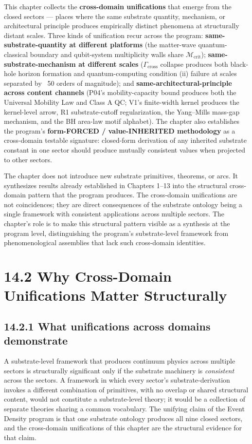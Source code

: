 \documentclass[11pt]{book}
\begin{document}
This chapter collects the \textbf{cross-domain unifications} that emerge from the closed sectors — places where the same substrate quantity, mechanism, or architectural principle produces empirically distinct phenomena at structurally distant scales. Three kinds of unification recur across the program: \textbf{same-substrate-quantity at different platforms} (the matter-wave quantum-classical boundary and qubit-system multiplicity walls share $\mathcal{M}_\mathrm{crit}$); \textbf{same-substrate-mechanism at different scales} ($\Gamma_\mathrm{cross}$ collapse produces both black-hole horizon formation and quantum-computing condition (ii) failure at scales separated by ~50 orders of magnitude); and \textbf{same-architectural-principle across content channels} (P04's mobility-capacity bound produces both the Universal Mobility Law and Class A QC; V1's finite-width kernel produces the kernel-level arrow, R1 substrate-cutoff regularization, the Yang–Mills mass-gap mechanism, and the BH area-law motif alphabet). The chapter also establishes the program's \textbf{form-FORCED / value-INHERITED methodology} as a cross-domain testable signature: closed-form derivation of any inherited substrate constant in one sector should produce mutually consistent values when projected to other sectors.

The chapter does not introduce new substrate primitives, theorems, or arcs. It synthesizes results already established in Chapters 1–13 into the structural cross-domain pattern that the program produces. The cross-domain unifications are not coincidences; they are direct consequences of the substrate ontology being a single framework with consistent applications across multiple sectors. The chapter's role is to make this structural pattern visible as a synthesis at the program level, distinguishing the program's substrate-level framework from phenomenological assemblies that lack such cross-domain identities.

\section{14.2 Why Cross-Domain Unifications Matter Structurally}

\subsection{14.2.1 What unifications across domains demonstrate}

A substrate-level framework that produces continuum physics across multiple sectors is structurally significant only if the substrate machinery is \textit{consistent} across the sectors. A framework in which every sector's substrate-derivation invokes a different combination of primitives, with no overlap or shared structural content, would not constitute a substrate-level theory; it would be a collection of separate theories sharing a common vocabulary. The unifying claim of the Event Density program is that one substrate ontology produces all nine closed sectors, and the cross-domain unifications of this chapter are the structural evidence for that claim.
\end{document}
